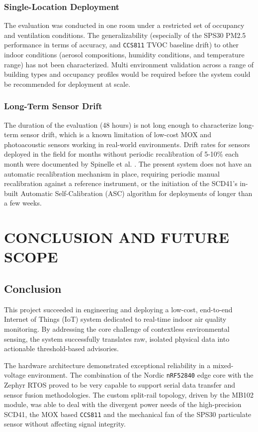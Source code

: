 \documentclass[conference]{IEEEtran}
\begin{document}
\subsubsection{Single-Location Deployment}
The evaluation was conducted in one room under a restricted set of occupancy and ventilation conditions. The generalizability (especially of the SPS30 PM2.5 performance in terms of accuracy, and \texttt{CCS811} TVOC baseline drift) to other indoor conditions (aerosol compositions, humidity conditions, and temperature range) has not been characterized. Multi environment validation across a range of building types and occupancy profiles would be required before the system could be recommended for deployment at scale.

\subsubsection{Long-Term Sensor Drift}
The duration of the evaluation (48 hours) is not long enough to characterize long-term sensor drift, which is a known limitation of low-cost MOX and photoacoustic sensors working in real-world environments. Drift rates for sensors deployed in the field for months without periodic recalibration of 5-10\% each month were documented by Spinelle et al. \cite{b14}. The present system does not have an automatic recalibration mechanism in place, requiring periodic manual recalibration against a reference instrument, or the initiation of the SCD41's in-built Automatic Self-Calibration (ASC) algorithm for deployments of longer than a few weeks.

\section{CONCLUSION AND FUTURE SCOPE}
\subsection{Conclusion}
This project succeeded in engineering and deploying a low-cost, end-to-end Internet of Things (IoT) system dedicated to real-time indoor air quality monitoring. By addressing the core challenge of contextless environmental sensing, the system successfully translates raw, isolated physical data into actionable threshold-based advisories.

The hardware architecture demonstrated exceptional reliability in a mixed-voltage environment. The combination of the Nordic \texttt{nRF52840} edge core with the Zephyr RTOS proved to be very capable to support serial data transfer and sensor fusion methodologies. The custom split-rail topology, driven by the MB102 module, was able to deal with the divergent power needs of the high-precision SCD41, the MOX based \texttt{CCS811} and the mechanical fan of the SPS30 particulate sensor without affecting signal integrity.
\end{document}

